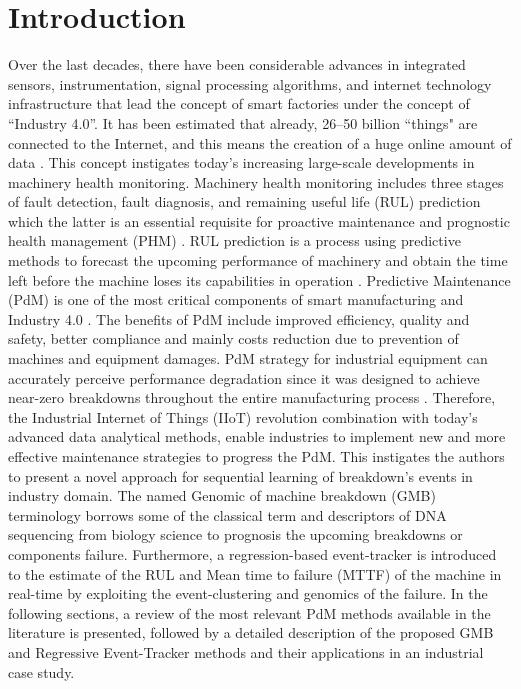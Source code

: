\documentclass[conference]{IEEEtran}
\begin{document}
\section{Introduction}
\label{sec:Introduction}
Over the last decades, there have been considerable advances in integrated sensors, instrumentation, signal processing algorithms, and internet technology infrastructure that lead the concept of smart factories under the concept of “Industry 4.0”. It has been estimated that already, \numrange{26}{50} billion ``things" are connected to the Internet, and this means the creation of a huge online amount of data \cite{Kumar2019}. This concept instigates today's increasing large-scale developments in machinery health monitoring.  Machinery health monitoring includes three stages of fault detection, fault diagnosis, and remaining useful life (RUL) prediction which the latter is an essential requisite for proactive maintenance and prognostic health management (PHM) \cite{Jin2019}. RUL prediction is a process using predictive methods to forecast the upcoming performance of machinery and obtain the time left before the machine loses its capabilities in operation \cite{Zhao2015}. Predictive Maintenance (PdM) is one of the most critical components of smart manufacturing and Industry 4.0 \cite{Calabrese2019}.  The beneﬁts of PdM include improved efficiency, quality and safety, better compliance and mainly costs reduction due to prevention of machines and equipment damages. PdM strategy for industrial equipment can accurately perceive performance degradation since it was designed to achieve near-zero breakdowns throughout the entire manufacturing process \cite{Zhang2019}. Therefore, the Industrial Internet of Things (IIoT) revolution combination with today's advanced data analytical methods, enable industries to implement new and more effective maintenance strategies to progress the PdM. This instigates the authors to present a novel approach for sequential learning of breakdown’s events in industry domain. The named Genomic of machine breakdown (GMB) terminology borrows some of the classical term and descriptors of DNA sequencing from biology science to prognosis the upcoming breakdowns or components failure. Furthermore, a regression-based event-tracker is introduced to the estimate of the RUL and Mean time to failure (MTTF) of the machine in real-time by exploiting the event-clustering and genomics of the failure. In the following sections, a review of the most relevant PdM methods available in the literature is presented, followed by a detailed description of the proposed GMB and Regressive Event-Tracker methods and their applications in an industrial case study.
\end{document}
